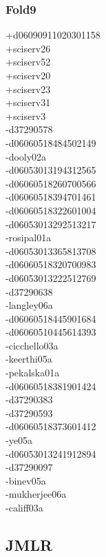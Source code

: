 \begin{multicols}{3}
\subsubsection*{Fold9}
+d06090911020301158\\
+sciserv26\\
+sciserv52\\
+sciserv20\\
+sciserv23\\
+sciserv31\\
+sciserv3\\
-d37290578\\
-d06060518484502149\\
-dooly02a\\
-d06053013194312565\\
-d06060518260700566\\
-d06060518394701461\\
-d06060518322601004\\
-d06053013292513217\\
-rosipal01a\\
-d06053013365813708\\
-d06060518320700983\\
-d06053013222512769\\
-d37290638\\
-langley06a\\
-d06060518445901684\\
-d06060510445614393\\
-cicchello03a\\
-keerthi05a\\
-pekalska01a\\
-d06060518381901424\\
-d37290383\\
-d37290593\\
-d06060518373601412\\
-ye05a\\
-d06053013241912894\\
-d37290097\\
-binev05a\\
-mukherjee06a\\
-califf03a

\clearpage
\subsection{JMLR}
\vspace{.5cm}


\end{multicols}

